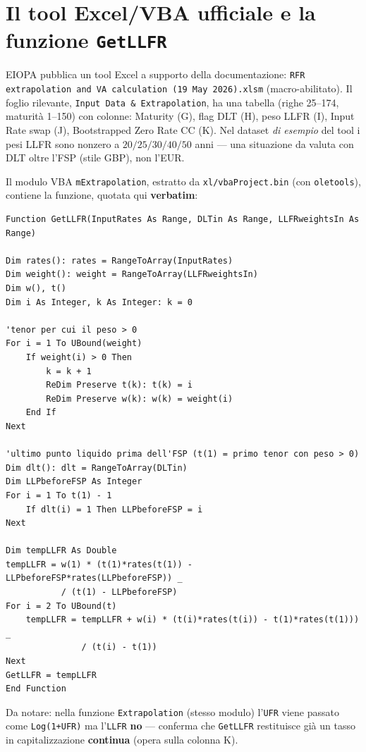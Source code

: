 \documentclass[11pt,a4paper]{article}
\theoremstyle{definition}
\theoremstyle{remark}
\begin{document}
\section{Il tool Excel/VBA ufficiale e la funzione \texttt{GetLLFR}}
\label{sec:tool}

EIOPA pubblica un tool Excel a supporto della documentazione:
\texttt{RFR extrapolation and VA calculation (19 May 2026).xlsm} (macro-abilitato). Il foglio
rilevante, \texttt{Input Data \& Extrapolation}, ha una tabella (righe 25--174, maturit\`a
1--150) con colonne: Maturity (G), flag DLT (H), peso LLFR (I), Input Rate swap (J),
Bootstrapped Zero Rate CC (K). Nel dataset \emph{di esempio} del tool i pesi LLFR sono nonzero
a $20/25/30/40/50$ anni --- una situazione da valuta con DLT oltre l'FSP (stile GBP), non
l'EUR.

Il modulo VBA \texttt{mExtrapolation}, estratto da \texttt{xl/vbaProject.bin} (con
\texttt{oletools}), contiene la funzione, quotata qui \textbf{verbatim}:

\begin{Verbatim}[fontsize=\small,frame=single]
Function GetLLFR(InputRates As Range, DLTin As Range, LLFRweightsIn As Range)

Dim rates(): rates = RangeToArray(InputRates)
Dim weight(): weight = RangeToArray(LLFRweightsIn)
Dim w(), t()
Dim i As Integer, k As Integer: k = 0

'tenor per cui il peso > 0
For i = 1 To UBound(weight)
    If weight(i) > 0 Then
        k = k + 1
        ReDim Preserve t(k): t(k) = i
        ReDim Preserve w(k): w(k) = weight(i)
    End If
Next

'ultimo punto liquido prima dell'FSP (t(1) = primo tenor con peso > 0)
Dim dlt(): dlt = RangeToArray(DLTin)
Dim LLPbeforeFSP As Integer
For i = 1 To t(1) - 1
    If dlt(i) = 1 Then LLPbeforeFSP = i
Next

Dim tempLLFR As Double
tempLLFR = w(1) * (t(1)*rates(t(1)) - LLPbeforeFSP*rates(LLPbeforeFSP)) _
           / (t(1) - LLPbeforeFSP)
For i = 2 To UBound(t)
    tempLLFR = tempLLFR + w(i) * (t(i)*rates(t(i)) - t(1)*rates(t(1))) _
               / (t(i) - t(1))
Next
GetLLFR = tempLLFR
End Function
\end{Verbatim}

Da notare: nella funzione \texttt{Extrapolation} (stesso modulo) l'\texttt{UFR} viene passato
come \texttt{Log(1+UFR)} ma l'\texttt{LLFR} \textbf{no} --- conferma che \texttt{GetLLFR}
restituisce gi\`a un tasso in capitalizzazione \textbf{continua} (opera sulla colonna K).
\end{document}
